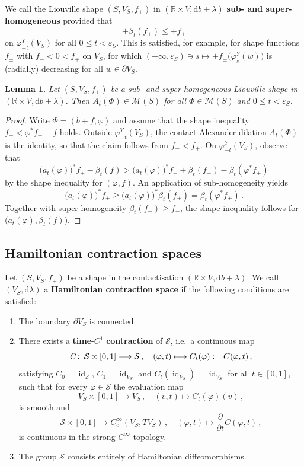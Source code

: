 \documentclass{amsart}
\newtheorem{lem}[prop]{Lemma}
\theoremstyle{definition}
\def\co{\colon\thinspace}
\newcommand{\rmd}{\mathrm d}
\newcommand{\MM}{\mathcal M}
\newcommand{\R}{\mathbb R}
\renewcommand{\SS}{\mathcal S}
\newcommand{\lra}{\longrightarrow}
\DeclareMathOperator{\id}{\mathrm{id}}
\begin{document}
We call the Liouville shape $(S,V_S,f_{\pm})$
in $(\R\times V,\rmd b+\lambda)$
{\bf sub- and super-homogeneous}
provided that
\[
\pm\beta_t(f_{\pm})
\leq\pm f_{\pm}
\]
on $\varphi^Y_{-t}(V_S)$ for all $0\leq t<\varepsilon_S$.
This is satisfied, for example,
for shape functions $f_{\pm}$ with $f_-<0<f_+$ on $V_S$,
for which
$(-\infty,\varepsilon_S)\ni s\mapsto\pm f_{\pm}\big(\varphi^Y_s(w)\big)$
is (radially) decreasing for all $w\in\partial V_S$.


\begin{lem}
\label{lem:alexshapeineq}
Let $(S,V_S,f_{\pm})$ be a sub- and super-homogeneous
Liouville shape in $(\R\times V,\rmd b+\lambda)$.
Then $A_t(\Phi)\in\MM(S)$
for all $\Phi\in\MM(S)$ and $0\leq t<\varepsilon_S$.
\end{lem}

\begin{proof}
Write $\Phi=(b+f,\varphi)$ and assume that
the shape inequality $f_-<\varphi^*f_+-f$
holds.
Outside $\varphi^Y_{-t}(V_S)$,
the contact Alexander dilation $A_t(\Phi)$ is the identity,
so that the claim follows from $f_-<f_+$.
On $\varphi^Y_{-t}(V_S)$,
observe that
\[
\big(a_t(\varphi)\big)^*f_+-\beta_t(f)>
\big(a_t(\varphi)\big)^*f_++\beta_t(f_-)-\beta_t(\varphi^*f_+)
\]
by the shape inequality for $(\varphi,f)$.
An application of sub-homogeneity yields
\[
\big(a_t(\varphi)\big)^*f_+\geq
\big(a_t(\varphi)\big)^*\beta_t(f_+)=
\beta_t(\varphi^*f_+)
\,.
\]
Together with super-homogeneity $\beta_t(f_-)\geq f_-$,
the shape inequality follows for $\big(a_t(\varphi),\beta_t(f)\big)$.
\end{proof}



\subsection{Hamiltonian contraction spaces\label{subsec:hamcontrspace}}


Let $(S,V_S,f_{\pm})$ be a shape in
the contactisation $(\R\times V,\rmd b+\lambda)$.
We call $(V_S,\rmd\lambda)$
a {\bf Hamiltonian contraction space}
if the following conditions are satisfied:
 	\begin{enumerate}
	 \item The boundary $\partial V_S$ is connected.
	 \item There exists a {\bf time}-$C^1$
	 {\bf contraction} of $\SS$, i.e.\ a continuous map
	 \[
	 C\co\SS\times[0,1]\lra\SS
	 \,,\quad
	 (\varphi,t)\longmapsto
	 C_t(\varphi):=C(\varphi,t)
	 \,,
	 \]
	 satisfying $C_0=\id_{\SS}$, $C_1=\id_{V_S}$ and
	 $C_t(\id_{V_S})=\id_{V_S}$ for all $t\in[0,1]$,
	 such that for every $\varphi\in\SS$ the evaluation map
	 \[
	 V_S\times[0,1]\lra V_S
	 \,,\quad
	 (v,t)\longmapsto C_t(\varphi)(v)
	 \,,
	 \]
	 is smooth and
	 \[
	 \SS\times[0,1]\lra C_c^{\infty}(V_S,TV_S)
	 \,,\quad
	 (\varphi,t)\longmapsto
	 \frac{\partial}{\partial t}C(\varphi,t)
	 \,,
	 \]
	 is continuous in the strong $C^{\infty}$-topology.
	 \item The group $\SS$ consists entirely
	 of Hamiltonian diffeomorphisms.
 	\end{enumerate}
\end{document}
